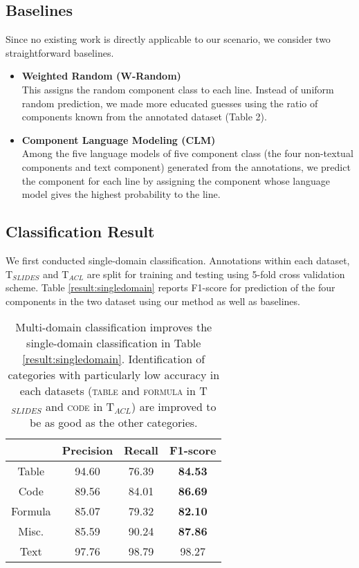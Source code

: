 \documentclass[11pt,letterpaper]{article}
\begin{document}
\subsection{Baselines} 
Since no existing work is directly applicable to our scenario, we consider two straightforward baselines.
\begin{itemize} 
\item \textbf{Weighted Random (W-Random)} \\ This assigns the random component class to each line. Instead of uniform random prediction, we made more educated guesses using the ratio of components known from the annotated dataset (Table 2). 

\item \textbf{Component Language Modeling (CLM)} \\ Among the five language models of five component class (the four non-textual components  and text component) generated from the annotations, we predict the component for each line by assigning the component whose language model gives the highest probability to the line. 
\end{itemize}

\subsection{Classification Result} 
We first conducted single-domain classification. Annotations within each dataset, T$_{SLIDES}$ and T$_{ACL}$ are split for training and testing using 5-fold cross validation scheme. Table \ref{result:singledomain} reports F1-score for prediction of the four components in the two dataset using our method as well as baselines.  

\begin{table}[h]
\centering
\begin{tabular}{@{}cccc@{}}

\toprule
        & Precision & Recall & F1-score \\ \midrule
Table   & 94.60     & 76.39  & \textbf{84.53}      \\
Code    & 89.56     & 84.01  & \textbf{86.69}      \\
Formula & 85.07     & 79.32  & \textbf{82.10}      \\
Misc.   & 85.59     & 90.24  & \textbf{87.86}      \\ 
Text & 97.76 & 98.79 & 98.27 \\
\bottomrule
\end{tabular}
\caption{Multi-domain classification improves the single-domain classification in Table \ref{result:singledomain}. Identification of categories with particularly low accuracy in each datasets (\textsc{table} and \textsc{formula} in T$_{SLIDES}$ and \textsc{code} in T$_{ACL}$) are improved to be as good as the other categories. }
\label{cross-domain}
\end{table}
\end{document}
